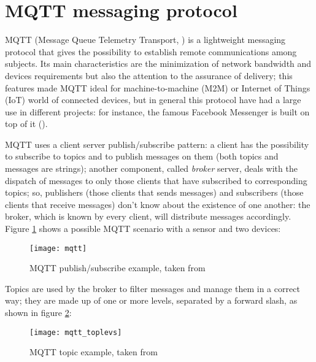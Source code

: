\section{MQTT messaging protocol}\label{mqtt}

MQTT (Message Queue Telemetry Transport, \cite{banks2014mqtt}) is a lightweight messaging protocol that gives the possibility to establish remote communications among subjects. Its main characteristics are the minimization of network bandwidth and devices requirements but also the attention to the assurance of delivery; this features made MQTT ideal for machine-to-machine (M2M) or Internet of Things (IoT) world of connected devices, but in general this protocol have had a large use in different projects: for instance, the famous Facebook Messenger is built on top of it (\cite{zhang2011building}).

MQTT uses a client server publish\slash{}subscribe pattern: a client has the possibility to subscribe to topics and to publish messages on them (both topics and messages are strings); another component, called \textit{broker} server, deals with the dispatch of messages to only those clients that have subscribed to corresponding topics; so, publishers (those clients that sends messages) and subscribers (those clients that receive messages) don't know about the existence of one another: the broker, which is known by every client, will distribute messages accordingly. Figure \ref{fig::mqtt_example} shows a possible MQTT scenario with a sensor and two devices:

\begin{figure}[H]

    \centering
    \texttt{[image: mqtt]}
    \caption{MQTT publish/subscribe example, taken from \cite{site:hivemq}}
    \label{fig::mqtt_example}

\end{figure}

Topics are used by the broker to filter messages and manage them in a correct way; they are made up of one or more levels, separated by a forward slash, as shown in figure \ref{fig::topic}:

\begin{figure}[H]

    \centering
    \texttt{[image: mqtt\_toplevs]}
    \caption{MQTT topic example, taken from \cite{site:hivemq}}
    \label{fig::topic}

\end{figure}


